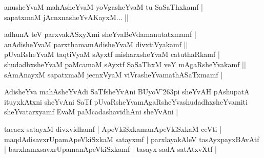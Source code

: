 \begin{entry}
\begin{shl}
anusheYvaM mahAsheYvaM yoVgasheYvaM tu SaSaThxkamf |\\[2pt]
sapatxmaM jAcnxnasheYvAKayxM... ||\\[-1pt]
\end{shl}
\medskip
{}
\medskip
{}
\medskip
\begin{shl}
adhunA teV parxvakASxyXmi sheYvaBeVdamanutatxmamf |\\[2pt]
anAdisheYvaM parxthamamAdisheYvaM divxtiVyakamf ||\\[2pt]
pUvaRsheYvaM taqtiVyaM sAyxtf misharxsheYvaM catuthaRkamf |\\[2pt]
shudadhxsheYvaM paMcamaM sAyxtf SaSaThxM veY mAgaRsheYvakamf ||\\[2pt]
sAmAnayxM sapatxmaM jecnxVyaM viVrasheYvamathASaTxmamf |\\[-1pt]
\end{shl}
\medskip
{}
\medskip
{}
\medskip
\begin{shl}
AdisheYva mahAsheYvAdi SaTfsheYvAni BUyoV{\char'263}pi sheYvAH pAshupatA ituyxkAtxni sheYvAni SaTf pUvaRsheYvamAgaRsheYvashudadhxsheYvamiti sheYvatarxyamf EvaM paMcadashavidhAni sheYvAni |
\end{shl}
\medskip
{}
\medskip
\begin{shl}
tacacx satayxM divxvidhamf | ApeVkiSxkamanApeVkiSxkaM ceVti | maqdAdisavxrUpamApeVkiSxkaM satayxmf | parxlayakAleV tasAyxpayxBAvAtf | barxhamxsavxrUpamanApeVkiSxkamf | tasayx sadA satAtxvXtf |\\[-1pt]
\end{shl}
\smallskip
{}
\medskip
{}
\medskip
\begin{shl}

\end{shl}
\end{entry}
